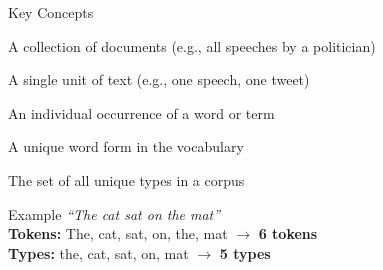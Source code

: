 \documentclass[aspectratio=169]{beamer}
\begin{document}
\begin{frame}{Key Concepts}
    \begin{description}
        \item[\textbf{Corpus}] A collection of documents (e.g., all speeches by a politician)
        \item[\textbf{Document}] A single unit of text (e.g., one speech, one tweet)
        \item[\textbf{Token}] An individual occurrence of a word or term
        \item[\textbf{Type}] A unique word form in the vocabulary
        \item[\textbf{Vocabulary}] The set of all unique types in a corpus
    \end{description}

    \vspace{0.4cm}
    \begin{exampleblock}{Example}
        \textit{``The cat sat on the mat''}\\[0.2cm]
        \textbf{Tokens:} The, cat, sat, on, the, mat \(\rightarrow\) \textbf{6 tokens}\\
        \textbf{Types:} the, cat, sat, on, mat \(\rightarrow\) \textbf{5 types}
    \end{exampleblock}
\end{frame}
\end{document}
